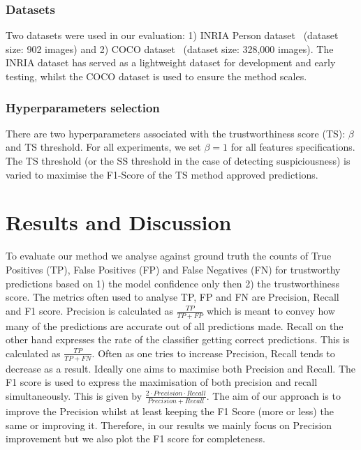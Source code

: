 \subsubsection{Datasets}
Two datasets were used in our evaluation: 1) INRIA Person dataset~\cite{Dalal2005} (dataset size: 902 images) and 2) COCO dataset~\cite{COCO_dataset} (dataset size: 328,000 images). 
%
The INRIA dataset has served as a lightweight dataset for development and early testing, whilst the COCO dataset is used to ensure the method scales.%


\subsubsection{Hyperparameters selection}
There are two hyperparameters associated with the trustworthiness score (TS): $\beta$ and TS threshold. For all experiments, we set $\beta = 1$ for all features specifications. The TS threshold (or the SS threshold in the case of detecting suspiciousness) is varied to maximise the F1-Score of the TS method approved predictions.


\section{Results and Discussion} \label{sec:results}
To evaluate our method we analyse against ground truth the counts of True Positives (TP), False Positives (FP) and False Negatives (FN) for trustworthy predictions based on 1) the model confidence only then 2) the trustworthiness score.  
%
The metrics often used to analyse TP, FP and FN are Precision, Recall and F1 score. Precision is calculated as $\frac{TP}{TP+FP}$  which is meant to convey how many of the predictions are accurate out of all predictions made. Recall on the other hand expresses the rate of the classifier getting correct predictions. This is calculated as $\frac{TP}{TP+FN}$. Often as one tries to increase Precision, Recall tends to decrease as a result. Ideally one aims to maximise both Precision and Recall. The F1 score is used to express the maximisation of both precision and recall simultaneously. This is given by $\frac{2\cdot Precision\cdot Recall}{Precision + Recall}$.
%
The aim of our approach is to improve the Precision whilst at least keeping the F1 Score (more or less) the same or improving it. 
%
Therefore, in our results we mainly focus on Precision improvement but we also plot the F1 score for completeness. 
%


